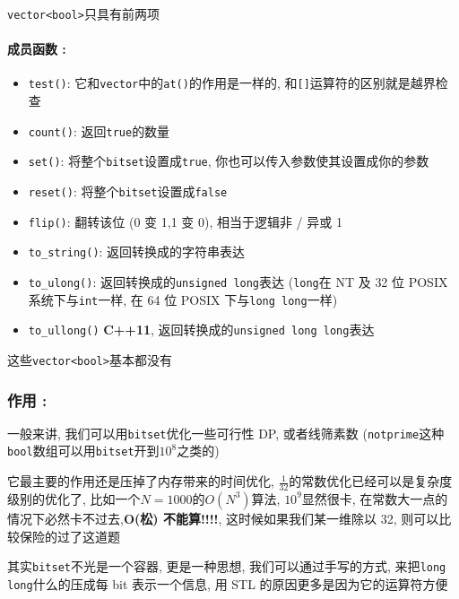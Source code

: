\texttt{vector<bool>}只具有前两项

\paragraph{成员函数 :}

\begin{itemize}
\item \texttt{test()}: 它和\texttt{vector}中的\texttt{at()}的作用是一样的, 和\texttt{[]}运算符的区别就是越界检查
\item \texttt{count()}: 返回\texttt{true}的数量
\item \texttt{set()}: 将整个\texttt{bitset}设置成\texttt{true}, 你也可以传入参数使其设置成你的参数
\item \texttt{reset()}: 将整个\texttt{bitset}设置成\texttt{false}
\item \texttt{flip()}: 翻转该位 (0 变 1,1 变 0), 相当于逻辑非 / 异或 1
\item \texttt{to\_string()}: 返回转换成的字符串表达
\item \texttt{to\_ulong()}: 返回转换成的\texttt{unsigned long}表达 (\texttt{long}在 NT 及 32 位 POSIX 系统下与\texttt{int}一样,  在 64 位 POSIX 下与\texttt{long long}一样)
\item \texttt{to\_ullong()} \textbf{C++11}, 返回转换成的\texttt{unsigned long long}表达
\end{itemize}

这些\texttt{vector<bool>}基本都没有

\subsubsection{作用 :}

一般来讲, 我们可以用\texttt{bitset}优化一些可行性 DP, 或者线筛素数 (\texttt{notprime}这种\texttt{bool}数组可以用\texttt{bitset}开到$10^8$之类的)

它最主要的作用还是压掉了内存带来的时间优化, $\frac{1}{32}$的常数优化已经可以是复杂度级别的优化了, 比如一个$N = 1000$的$O(N^3)$算法, $10^9$显然很卡, 在常数大一点的情况下必然卡不过去,\textbf{O(松) 不能算!!!!}, 这时候如果我们某一维除以 32, 则可以比较保险的过了这道题

其实\texttt{bitset}不光是一个容器, 更是一种思想, 我们可以通过手写的方式, 来把\texttt{long long}什么的压成每 bit 表示一个信息, 用 STL 的原因更多是因为它的运算符方便
